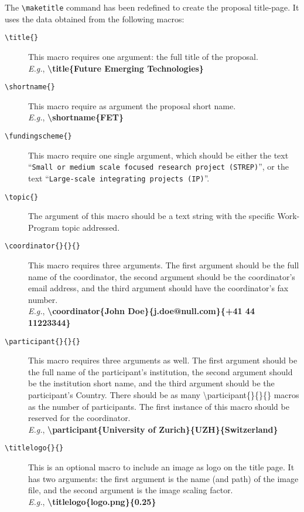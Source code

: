 \documentclass[pdftext]{article}
\begin{document}
The \texttt{\textbackslash maketitle} command has been redefined to create the proposal title-page. It uses the data obtained from the following macros:
\begin{description}
\item[\texttt{\textbackslash title\{\}}] This macro requires one   argument: the full title of the proposal.\\
  \emph{E.g.}, \textbf{\textbackslash title\{Future Emerging Technologies\}}
\item[\texttt{\textbackslash  shortname\{\}}] This macro require as   argument the proposal short name.\\
  \emph{E.g.}, \textbf{\textbackslash shortname\{FET\}}
\item[\texttt{\textbackslash fundingscheme\{\}}] This macro require one single argument, which should be either the text  ``\texttt{Small
    or medium scale focused research project (STREP)}'', or the text  ``\texttt{Large-scale integrating projects (IP)}''.
\item[\texttt{\textbackslash topic\{\}}] The argument of this macro should be a text string with the specific Work-Program topic addressed.
\item[\texttt{\textbackslash  coordinator\{\}\{\}\{\}}] This macro requires three arguments. The first argument should be the full name of the coordinator, the second argument should be the coordinator's email address, and the third argument should have the coordinator's fax number.\\
  \emph{E.g.}, \textbf{\textbackslash coordinator\{John Doe\}\{j.doe@null.com\}\{+41 44 11223344\}}
\item[\texttt{\textbackslash participant\{\}\{\}\{\}}] This macro requires three arguments as well. The first argument should be the full name of the participant's institution, the second argument should be the institution short name, and the third argument should be the participant's Country. There should be as many \textbackslash participant\{\}\{\}\{\} macros as the number of participants. The first instance of this macro should be reserved for the coordinator.\\
  \emph{E.g.}, \textbf{\textbackslash participant\{University of Zurich\}\{UZH\}\{Switzerland\}}
\item[\texttt{\textbackslash  titlelogo\{\}\{\}}] This is an optional macro to include an image as logo on the title page. It has two arguments: the first argument is the name (and path) of the image file, and the second argument is the image scaling factor.\\
  \emph{E.g.}, \textbf{\textbackslash titlelogo\{logo.png\}\{0.25\}}
\end{description}
\end{document}
